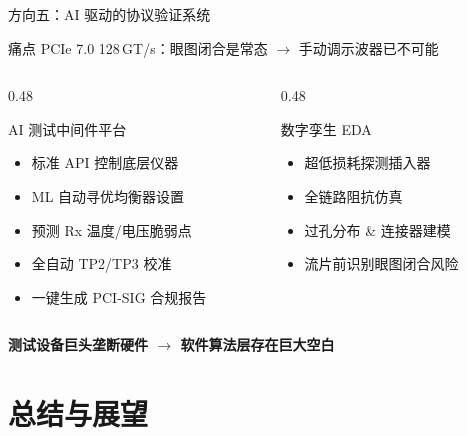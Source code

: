 \documentclass[aspectratio=169, 10pt, UTF8]{ctexbeamer}
\begin{document}
\begin{frame}{方向五：AI 驱动的协议验证系统}
  \begin{block}{痛点}
    PCIe 7.0 128\,GT/s：眼图闭合是常态 $\to$ 手动调示波器已不可能
  \end{block}

  \vspace{6pt}
  \begin{columns}[T]
    \begin{column}{0.48\textwidth}
      \begin{block}{AI 测试中间件平台}
        \begin{itemize}
          \item 标准 API 控制底层仪器
          \item ML 自动寻优均衡器设置
          \item 预测 Rx 温度/电压脆弱点
          \item 全自动 TP2/TP3 校准
          \item 一键生成 PCI-SIG 合规报告
        \end{itemize}
      \end{block}
    \end{column}
    \begin{column}{0.48\textwidth}
      \begin{exampleblock}{数字孪生 EDA}
        \begin{itemize}
          \item 超低损耗探测插入器
          \item 全链路阻抗仿真
          \item 过孔分布 \& 连接器建模
          \item 流片前识别眼图闭合风险
        \end{itemize}
      \end{exampleblock}
    \end{column}
  \end{columns}

  \vspace{8pt}
  \begin{center}
    \textbf{测试设备巨头垄断硬件 $\to$ 软件算法层存在巨大空白}
  \end{center}
\end{frame}

\section{总结与展望}
\end{document}
